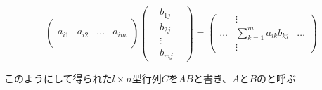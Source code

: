 \documentclass[../../../topic_linear-map]{subfiles}
\begin{document}
\begin{equation*}
  \begin{pmatrix}
           &        &       &        \\
           &        &       &        \\
    a_{i1} & a_{i2} & \dots & a_{im} \\
           &        &       &        \\
           &        &       &
  \end{pmatrix}
  \begin{pmatrix}
     & b_{1j} & \\
     & b_{2j} & \\
     & \vdots & \\
     & b_{mj} &
  \end{pmatrix} = \begin{pmatrix}
          & \vdots                                  &       \\
    \dots & \displaystyle\sum_{k=1}^m a_{ik} b_{kj} & \dots \\
          & \vdots                                  &
  \end{pmatrix}
\end{equation*}

\br

このようにして得られた$l \times n$型行列$C$を$AB$と書き、$A$と$B$のと呼ぶ
\end{document}
